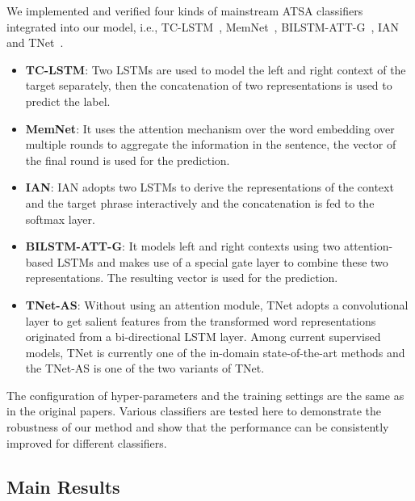\documentclass[11pt,a4paper]{article}
\begin{document}
We implemented and verified four kinds of mainstream ATSA classifiers integrated into our model, i.e., TC-LSTM~\cite{DBLP:conf/coling/TangQFL16}, MemNet~\cite{DBLP:conf/emnlp/TangQL16}, BILSTM-ATT-G~\cite{DBLP:conf/eacl/ZhangL17}, IAN~\cite{DBLP:conf/ijcai/MaLZW17} and TNet~\cite{li2018transformation}.
\begin{itemize}
	\item \textbf{TC-LSTM}: Two LSTMs are used to model the left and right context of the target separately, then the concatenation of two representations is used to predict the label.
\item \textbf{MemNet}: It uses the attention mechanism over the word embedding over multiple rounds to aggregate the information in the sentence, the vector of the final round is used for the prediction.
	\item \textbf{IAN}: IAN adopts two LSTMs to derive the representations of the context and the target phrase interactively and the concatenation is fed to the softmax layer.
	\item \textbf{BILSTM-ATT-G}: It models left and right contexts using two attention-based LSTMs and makes use of a special gate layer to combine these two representations. The resulting vector is used for the prediction.
		\item \textbf{TNet-AS}: Without using an attention module, TNet adopts a convolutional layer to get salient features from the transformed word representations originated from a bi-directional LSTM layer. Among current supervised models, TNet is currently one of the in-domain state-of-the-art methods and the TNet-AS is one of the two variants of TNet. 
	
\end{itemize}
The configuration of hyper-parameters and the training settings are the same as in the original papers.
Various classifiers are tested here to demonstrate the robustness of our method and show that the performance can be consistently improved for different classifiers.


\subsection{Main Results}
\end{document}
